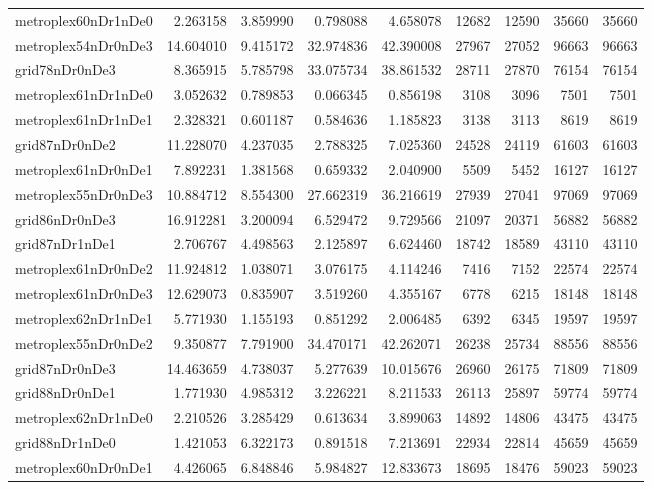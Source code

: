 \begin{longtable}{|l|r|r|r|r|r|r|r|r|}
metroplex60nDr1nDe0 & 2.263158 & 3.859990 & 0.798088 & 4.658078 & 12682 & 12590 & 35660 & 35660 \\
metroplex54nDr0nDe3 & 14.604010 & 9.415172 & 32.974836 & 42.390008 & 27967 & 27052 & 96663 & 96663 \\
grid78nDr0nDe3 & 8.365915 & 5.785798 & 33.075734 & 38.861532 & 28711 & 27870 & 76154 & 76154 \\
metroplex61nDr1nDe0 & 3.052632 & 0.789853 & 0.066345 & 0.856198 & 3108 & 3096 & 7501 & 7501 \\
metroplex61nDr1nDe1 & 2.328321 & 0.601187 & 0.584636 & 1.185823 & 3138 & 3113 & 8619 & 8619 \\
grid87nDr0nDe2 & 11.228070 & 4.237035 & 2.788325 & 7.025360 & 24528 & 24119 & 61603 & 61603 \\
metroplex61nDr0nDe1 & 7.892231 & 1.381568 & 0.659332 & 2.040900 & 5509 & 5452 & 16127 & 16127 \\
metroplex55nDr0nDe3 & 10.884712 & 8.554300 & 27.662319 & 36.216619 & 27939 & 27041 & 97069 & 97069 \\
grid86nDr0nDe3 & 16.912281 & 3.200094 & 6.529472 & 9.729566 & 21097 & 20371 & 56882 & 56882 \\
grid87nDr1nDe1 & 2.706767 & 4.498563 & 2.125897 & 6.624460 & 18742 & 18589 & 43110 & 43110 \\
metroplex61nDr0nDe2 & 11.924812 & 1.038071 & 3.076175 & 4.114246 & 7416 & 7152 & 22574 & 22574 \\
metroplex61nDr0nDe3 & 12.629073 & 0.835907 & 3.519260 & 4.355167 & 6778 & 6215 & 18148 & 18148 \\
metroplex62nDr1nDe1 & 5.771930 & 1.155193 & 0.851292 & 2.006485 & 6392 & 6345 & 19597 & 19597 \\
metroplex55nDr0nDe2 & 9.350877 & 7.791900 & 34.470171 & 42.262071 & 26238 & 25734 & 88556 & 88556 \\
grid87nDr0nDe3 & 14.463659 & 4.738037 & 5.277639 & 10.015676 & 26960 & 26175 & 71809 & 71809 \\
grid88nDr0nDe1 & 1.771930 & 4.985312 & 3.226221 & 8.211533 & 26113 & 25897 & 59774 & 59774 \\
metroplex62nDr1nDe0 & 2.210526 & 3.285429 & 0.613634 & 3.899063 & 14892 & 14806 & 43475 & 43475 \\
grid88nDr1nDe0 & 1.421053 & 6.322173 & 0.891518 & 7.213691 & 22934 & 22814 & 45659 & 45659 \\
metroplex60nDr0nDe1 & 4.426065 & 6.848846 & 5.984827 & 12.833673 & 18695 & 18476 & 59023 & 59023 \\

\end{longtable}
